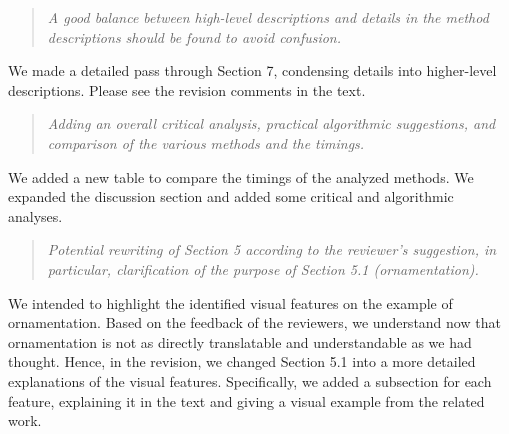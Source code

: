 \documentclass{egpubl}
\newcommand{\rev}[2]{{\color{greenrev}\textsuperscript{#1}#2}}
\renewcommand{\rev}[2]{{#2}}
\begin{document}



\begin{quote}
\emph{
    A good balance between high-level descriptions and details in the method descriptions should be found to avoid confusion.
    }
\end{quote}

\rev{}{We made a detailed pass through Section 7, condensing details into higher-level descriptions. Please see the revision comments in the text.}

\begin{quote}
\emph{
    Adding an overall critical analysis, practical algorithmic suggestions, and comparison of the various methods and the timings.
    }
\end{quote}

\rev{}{We added a new table to compare the timings of the analyzed methods. We expanded the discussion section and added some critical and algorithmic analyses.}


\begin{quote}
\emph{
    Potential rewriting of Section 5 according to the reviewer's suggestion, in particular, clarification of the purpose of Section 5.1 (ornamentation).
    }
\end{quote}

\rev{}{We intended to highlight the identified visual features on the example of ornamentation. Based on the feedback of the reviewers, we understand now that ornamentation is not as directly translatable and understandable as we had thought. Hence, in the revision, we changed Section 5.1 into a more detailed explanations of the visual features. Specifically, we added a subsection for each feature, explaining it in the text and giving a visual example from the related work.}
\end{document}

